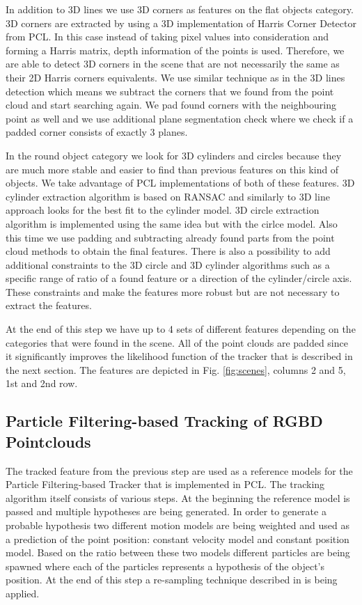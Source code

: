 In addition to 3D lines we use 3D corners as features on the flat objects category. 3D corners are extracted by using a 3D implementation of Harris Corner Detector from PCL. In this case instead of taking pixel values into consideration and forming a Harris matrix, depth information of the points is used. Therefore, we are able to detect 3D corners in the scene that are not necessarily the same as their 2D Harris corners equivalents. We use similar technique as in the 3D lines detection which means we subtract the corners that we found from the point cloud and start searching again. We pad found corners with the neighbouring point as well and we use additional plane segmentation check where we check if a padded corner consists of exactly 3 planes.

In the round object category we look for 3D cylinders and circles because they are much more stable and easier to find than previous features on this kind of objects. We take advantage of PCL implementations of both of these features. 3D cylinder extraction algorithm is based on RANSAC and similarly to 3D line approach looks for the best fit to the cylinder model. 3D circle extraction algorithm is implemented using the same idea but with the cirlce model. Also this time we use padding and subtracting already found parts from the point cloud methods to obtain the final features. There is also a possibility to add additional constraints to the 3D circle and 3D cylinder algorithms such as a specific range of ratio of a found feature or a direction of the cylinder/circle axis. These constraints and make the features more robust but are not necessary to extract the features. 

At the end of this step we have up to 4 sets of different features depending on the categories that were found in the scene. All of the point clouds are padded since it significantly improves the likelihood function of the tracker that is described in the next section. The features are depicted in Fig. \ref{fig:scenes}, columns 2 and 5, 1st and 2nd row. 




\subsection{Particle Filtering-based Tracking of RGBD Pointclouds}
\label{sec:tracking}
The tracked feature from the previous step are used as a reference models for the Particle Filtering-based Tracker that is implemented in PCL. The tracking algorithm itself consists of various steps. At the beginning the reference model is passed and multiple hypotheses are being generated. In order to generate a probable hypothesis two different motion models are being weighted and used as a prediction of the point position: constant velocity model and constant position model. Based on the ratio between these two models different particles are being spawned where each of the particles represents a hypothesis of the object's position. At the end of this step a re-sampling technique described in \cite{Walker} is being applied. 

